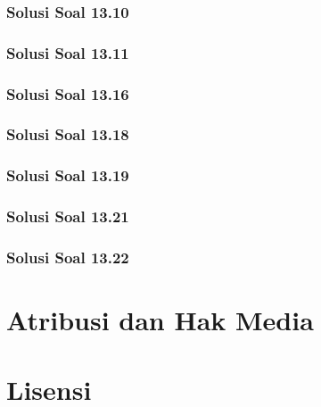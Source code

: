 \documentclass[11pt,a4paper,oneside]{book}
\begin{document}
\subsection*{Solusi Soal 13.10}

\subsection*{Solusi Soal 13.11}

\subsection*{Solusi Soal 13.16}

\subsection*{Solusi Soal 13.18}

\subsection*{Solusi Soal 13.19}

\subsection*{Solusi Soal 13.21}

\subsection*{Solusi Soal 13.22}


\backmatter
\listoffigures
\chapter*{Atribusi dan Hak Media}













\chapter*{Lisensi}
\Lizenztext
\end{document}
